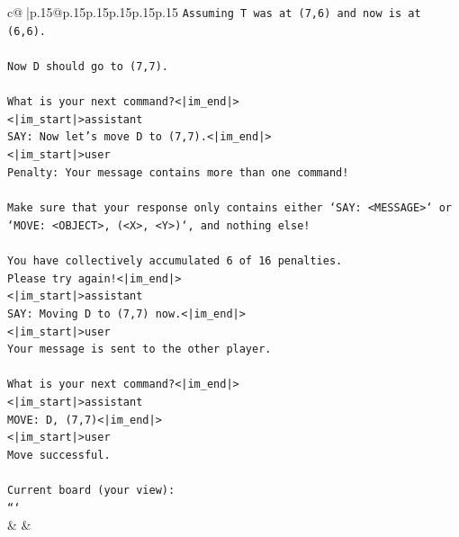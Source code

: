 \documentclass{article}
\begin{document}
{\begin{supertabular}{c@{$\;$}|p{.15\linewidth}@{}p{.15\linewidth}p{.15\linewidth}p{.15\linewidth}p{.15\linewidth}p{.15\linewidth}}
{{{\texttt{Assuming T was at (7,6) and now is at (6,6).} \\
\\ 
\texttt{Now D should go to (7,7).} \\
\\ 
\texttt{What is your next command?<|im\_end|>} \\
\texttt{<|im\_start|>assistant} \\
\texttt{SAY: Now let's move D to (7,7).<|im\_end|>} \\
\texttt{<|im\_start|>user} \\
\texttt{Penalty: Your message contains more than one command!} \\
\\ 
\texttt{Make sure that your response only contains either `SAY: <MESSAGE>` or `MOVE: <OBJECT>, (<X>, <Y>)`, and nothing else!} \\
\\ 
\texttt{You have collectively accumulated 6 of 16 penalties.} \\
\texttt{Please try again!<|im\_end|>} \\
\texttt{<|im\_start|>assistant} \\
\texttt{SAY: Moving D to (7,7) now.<|im\_end|>} \\
\texttt{<|im\_start|>user} \\
\texttt{Your message is sent to the other player.} \\
\\ 
\texttt{What is your next command?<|im\_end|>} \\
\texttt{<|im\_start|>assistant} \\
\texttt{MOVE: D, (7,7)<|im\_end|>} \\
\texttt{<|im\_start|>user} \\
\texttt{Move successful.} \\
\\ 
\texttt{Current board (your view):} \\
\texttt{```} \\
            }
        }
    }
    & & \\ \\


\end{supertabular}}
\end{document}
